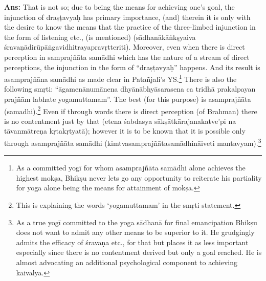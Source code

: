 \textbf{Ans:} That is not so; due to being the means for achieving one’s goal, the injunction of draṣṭavyaḥ has primary importance, (and) therein it is only with the desire to know the means that the practice of the three-limbed injunction in the form of listening etc., (is mentioned) (sādhanākāṅkṣyaiva śravaṇādirūpāṅgavidhitrayapravṛtteriti). Moreover, even when there is direct perception in samprajñāta samādhi which has the nature of a stream of direct perceptions, the injunction in the form of “draṣṭavyaḥ” happens. And its result is asamprajñāna samādhi as made clear in  Patañjali’s YS.\footnote{As a committed yogī for whom asamprajñāta samādhi alone achieves the highest mokṣa, Bhikṣu never lets go any opportunity to reiterate his partiality for yoga alone being the means for attainment of mokṣa.} There is also the following smṛti: “āgamenānumānena   dhyānābhyāsarasena ca tridhā prakal\-payan prajñām labhate yogamuttamam”. The best (for this purpose) is asamprajñāta (samadhi).\footnote{This is explaining the words ‘yogamuttamam’ in the smṛti statement.} Even if through words there is direct perception (of Brahman) there is no contentment just by that (etena śabdasya sākṣātkārajanakatve’pi na tāvanmātreṇa kṛtakṛtyatā); however it is to be known that it is possible only through asamprajñāta samādhi (kimtvasamprajñātasamādhināiveti mantavyam).\footnote{As a true yogī committed to the yoga sādhanā for final emancipation Bhikṣu does not want to admit any other means to be superior to it. He grudgingly admits the efficacy of śravaṇa etc., for that but places it as less important especially since there is no contentment derived but only a goal reached. He is almost advocating an additional psychological component to achieving kaivalya.}


